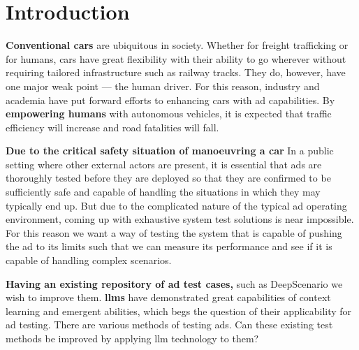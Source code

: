 \chapter{Introduction}

\textbf{Conventional cars} are ubiquitous in society. Whether for freight trafficking or for humans, cars have great flexibility with their ability to go wherever without requiring tailored infrastructure
such as railway tracks. They do, however, have one major weak point --- the human driver. For this
reason, industry and academia have put forward efforts to enhancing cars with \acrfull{ad}
capabilities.
By \textbf{empowering humans} with autonomous vehicles, it is expected that traffic efficiency will
increase and road fatalities will fall.

\textbf{Due to the critical safety situation of manoeuvring a car} In a public setting where other external
actors are present, it is essential that \acrlong{ads} are thoroughly tested before they are
deployed so that they are confirmed to be sufficiently safe and capable of handling the situations in which
they may typically end up.
But due to the complicated nature of the typical \acrshort{ad} operating environment, coming up with
exhaustive system test solutions is near impossible.
For this reason we want a way of testing the system that is capable of pushing the \acrlong{ad} to
its limits such that we can measure its performance and see if it is capable of
handling complex scenarios.

\textbf{Having an existing repository of \acrlong{ad} test cases,} such as
DeepScenario we wish to improve them. \textbf{\acrfull{llms}} have demonstrated
great capabilities of context learning and emergent abilities, which begs
the question of their  applicability for \acrshort{ad} testing.  There are
various methods of testing  \acrlong{ads}. Can these existing test methods be
improved by applying \acrshort{llm} technology to them?

